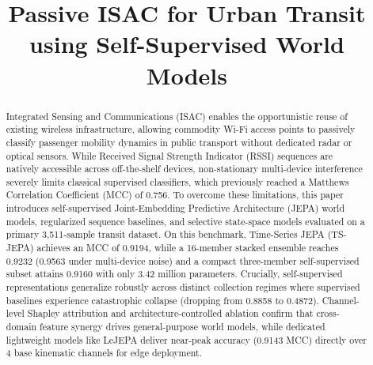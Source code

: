 \documentclass[conference]{IEEEtran}
\begin{document}
\title{Passive ISAC for Urban Transit using Self-Supervised World Models}

\author{
}

\maketitle

\begin{abstract}
    Integrated Sensing and Communications (ISAC) enables the opportunistic reuse of existing wireless infrastructure, allowing commodity Wi-Fi access points to passively classify passenger mobility dynamics in public transport without dedicated radar or optical sensors. While Received Signal Strength Indicator (RSSI) sequences are natively accessible across off-the-shelf devices, non-stationary multi-device interference severely limits classical supervised classifiers, which previously reached a Matthews Correlation Coefficient (MCC) of 0.756. To overcome these limitations, this paper introduces self-supervised Joint-Embedding Predictive Architecture (JEPA) world models, regularized sequence baselines, and selective state-space models evaluated on a primary 3,511-sample transit dataset. On this benchmark, Time-Series JEPA (TS-JEPA) achieves an MCC of 0.9194, while a 16-member stacked ensemble reaches 0.9232 (0.9563 under multi-device noise) and a compact three-member self-supervised subset attains 0.9160 with only 3.42 million parameters. Crucially, self-supervised representations generalize robustly across distinct collection regimes where supervised baselines experience catastrophic collapse (dropping from 0.8858 to 0.4872). Channel-level Shapley attribution and architecture-controlled ablation confirm that cross-domain feature synergy drives general-purpose world models, while dedicated lightweight models like LeJEPA deliver near-peak accuracy (0.9143 MCC) directly over 4 base kinematic channels for edge deployment.
\end{abstract}
\end{document}
